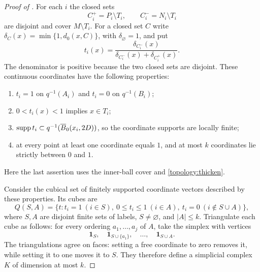 \begin{proof}[Proof of ]

For each $i$ the closed sets
\[
 C_i^+=P_i\setminus T_i,\qquad C_i^-=N_i\setminus T_i
\]
are disjoint and cover $M\setminus T_i$.  For a closed set $C$ write
$\delta_C(x)=\min\{1,d_0(x,C)\}$, with $\delta_\varnothing=1$, and put
\begin{equation}\label{topology:coordinates}
 t_i(x)=\frac{\delta_{C_i^-}(x)}
                    {\delta_{C_i^-}(x)+\delta_{C_i^+}(x)}.
\end{equation}
The denominator is positive because the two closed sets are disjoint.
These continuous coordinates have the following properties:
\begin{enumerate}[label=(\roman*)]
 \item $t_i=1$ on $q^{-1}(A_i)$ and $t_i=0$ on $q^{-1}(B_i)$;
 \item $0<t_i(x)<1$ implies $x\in T_i$;
 \item $\operatorname{supp} t_i\subset q^{-1}(\overline B_0(x_i,2D))$,
       so the coordinate supports are locally finite;
 \item at every point at least one coordinate equals $1$, and at most
       $k$ coordinates lie strictly between $0$ and $1$.
\end{enumerate}
Here the last assertion uses the inner-ball cover and
\cref{topology:thicken}.

Consider the cubical set of finitely supported coordinate vectors
described by these properties.  Its cubes are
\[
 Q(S,A)=\{t:t_i=1\ (i\in S),\ 0\le t_i\le1\ (i\in A),
                    \ t_i=0\ (i\notin S\cup A)\},
\]
where $S,A$ are disjoint finite sets of labels, $S\ne\varnothing$, and
$|A|\le k$.  Triangulate each cube as follows: for
every ordering $a_1,\ldots,a_j$ of $A$, take the simplex with vertices
\begin{equation}\label{topology:triangulation}
 \mathbf1_S,\quad \mathbf1_{S\cup\{a_1\}},\quad\ldots,\quad
 \mathbf1_{S\cup A}.
\end{equation}
The triangulations agree on faces: setting a free coordinate to zero
removes it, while setting it to one moves it to $S$.  They therefore
define a simplicial complex $K$ of dimension at most $k$.


\end{proof}
